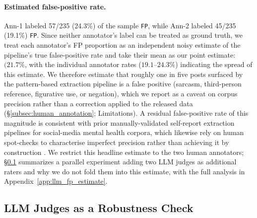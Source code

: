 \documentclass[11pt]{article}
\begin{document}
\paragraph{Estimated false-positive rate.} Ann-1 labeled 57/235 (24.3\%)
of the sample \texttt{FP}, while Ann-2 labeled 45/235 (19.1\%)
\texttt{FP}. Since neither annotator's label can be treated as ground
truth, we treat each annotator's FP proportion as an independent noisy
estimate of the pipeline's true false-positive rate and take their mean
as our point estimate: $(21.7\%$, with the
individual annotator rates ($19.1$--$24.3\%$) indicating the spread of
this estimate. We therefore estimate that roughly one in five posts
surfaced by the pattern-based extraction pipeline is a false positive
(sarcasm, third-person reference, figurative use, or negation), which
we report as a caveat on corpus precision rather than a correction
applied to the released data (§\ref{subsec:human_annotation};
Limitations). A residual false-positive rate of this magnitude is
consistent with prior manually-validated self-report extraction
pipelines for social-media mental health corpora, which likewise rely
on human spot-checks to characterise imperfect precision rather than
achieving it by construction \citep{cohan-etal-2018-smhd,
coppersmith-etal-2014-quantifying}. We restrict this headline estimate
to the two human annotators; \S\ref{subsec:llm_judges} summarizes a
parallel experiment adding two LLM judges as additional raters and why
we do not fold them into this estimate, with the full analysis in
Appendix~\ref{app:llm_fp_estimate}.

\subsection{LLM Judges as a Robustness Check}
\label{subsec:llm_judges}
\end{document}
